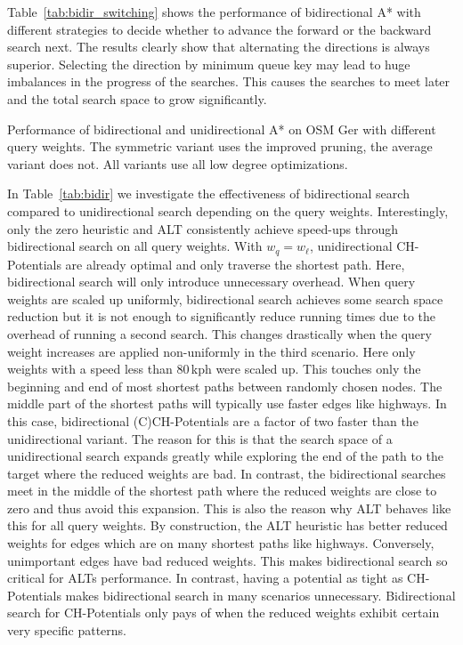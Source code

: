 \documentclass[manuscript,review]{acmart}
\begin{document}
Table~\ref{tab:bidir_switching} shows the performance of bidirectional A* with different strategies to decide whether to advance the forward or the backward search next.
The results clearly show that alternating the directions is always superior.
Selecting the direction by minimum queue key may lead to huge imbalances in the progress of the searches.
This causes the searches to meet later and the total search space to grow significantly.

\begin{table}
\centering
\caption{
Performance of bidirectional and unidirectional A* on OSM Ger with different query weights.
The symmetric variant uses the improved pruning, the average variant does not.
All variants use all low degree optimizations.
}\label{tab:bidir}

\end{table}

In Table~\ref{tab:bidir} we investigate the effectiveness of bidirectional search compared to unidirectional search depending on the query weights.
Interestingly, only the zero heuristic and ALT consistently achieve speed-ups through bidirectional search on all query weights.
With $w_q = w_{\ell}$, unidirectional CH-Potentials are already optimal and only traverse the shortest path.
Here, bidirectional search will only introduce unnecessary overhead.
When query weights are scaled up uniformly, bidirectional search achieves some search space reduction but it is not enough to significantly reduce running times due to the overhead of running a second search.
This changes drastically when the query weight increases are applied non-uniformly in the third scenario.
Here only weights with a speed less than 80\,kph were scaled up.
This touches only the beginning and end of most shortest paths between randomly chosen nodes.
The middle part of the shortest paths will typically use faster edges like highways.
In this case, bidirectional (C)CH-Potentials are a factor of two faster than the unidirectional variant.
The reason for this is that the search space of a unidirectional search expands greatly while exploring the end of the path to the target where the reduced weights are bad.
In contrast, the bidirectional searches meet in the middle of the shortest path where the reduced weights are close to zero and thus avoid this expansion.
This is also the reason why ALT behaves like this for all query weights.
By construction, the ALT heuristic has better reduced weights for edges which are on many shortest paths like highways.
Conversely, unimportant edges have bad reduced weights.
This makes bidirectional search so critical for ALTs performance.
In contrast, having a potential as tight as CH-Potentials makes bidirectional search in many scenarios unnecessary.
Bidirectional search for CH-Potentials only pays of when the reduced weights exhibit certain very specific patterns.
\end{document}
